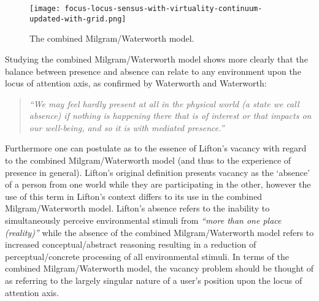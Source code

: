 \begin{figure}[h]
	\begin{center}
		\texttt{[image: focus-locus-sensus-with-virtuality-continuum-updated-with-grid.png]}
		\caption{The combined Milgram/Waterworth model.}
		\label{focus-locus-sensus-with-virtuality-continuum}
	\end{center}	
\end{figure}

Studying the combined Milgram/Waterworth model shows more clearly that the balance between presence and absence can relate to any environment upon the locus of attention axis, as confirmed by Waterworth and Waterworth:

\begin{quote}
	\textit{``We may feel hardly present at all in the physical world (a state we call absence) if nothing is happening there that is of interest or that impacts on our well-being, and so it is with mediated presence.''}~\cite{Waterworth2014}
\end{quote}

Furthermore one can postulate as to the essence of Lifton's vacancy with regard to the combined Milgram/Waterworth model (and thus to the experience of presence in general). Lifton's original definition presents vacancy as the `absence' of a person from one world while they are participating in the other, however the use of this term in Lifton's context differs to its use in the combined Milgram/Waterworth model. Lifton's absence refers to the inability to simultaneously perceive environmental stimuli from \textit{``more than one place (reality)''} while the absence of the combined Milgram/Waterworth model refers to increased conceptual/abstract reasoning resulting in a reduction of perceptual/concrete processing of all environmental stimuli. In terms of the combined Milgram/Waterworth model, the vacancy problem should be thought of as referring to the largely singular nature of a user's position upon the locus of attention axis.


